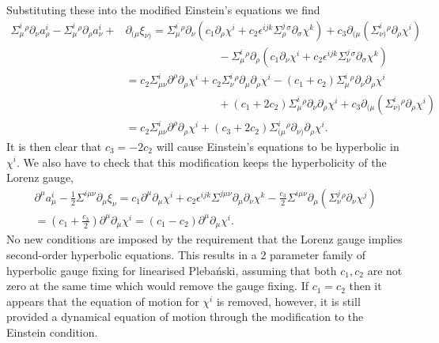 \documentclass[10pt]{report}
\newcommand{\pleb}[0]{Pleba\'nski}
\theoremstyle{definition}
\begin{document}
        Substituting these into the modified Einstein's equations we find 
        \begin{align}
            \Sigma^i_\mu{}^\rho \partial_\nu a^i_\rho - \Sigma^i_\mu{}^\rho \partial_\rho a^i_\nu +& \partial_{(\mu} \xi_{\nu)} = \Sigma^i_\mu{}^\rho \partial_\nu \left( c_1 \partial_\rho \chi^i + c_2 \epsilon^{ijk} \Sigma^j_\rho{}^\sigma \partial_\sigma \chi^k \right) + c_3 \partial_{(\mu} \left( \Sigma^i_{\nu)}{}^\rho \partial_\rho \chi^i \right) \nonumber \\ & \hspace{100pt} - \Sigma^i_\mu{}^\rho \partial_\rho \left( c_1 \partial_\nu \chi^i + c_2 \epsilon^{ijk} \Sigma^j_\nu{}^\sigma \partial_\sigma \chi^k \right)  \nonumber\\ & =  c_2 \Sigma^i_{\mu\nu} \partial^\rho \partial_\rho \chi^i + c_2 \Sigma^i_\nu{}^\rho \partial_\mu \partial_\rho \chi^i - (c_1 + c_2) \Sigma^i_\mu{}^\rho \partial_\nu \partial_\rho \chi^i \nonumber \\ & \hspace{100pt} + (c_1 + 2 c_2) \Sigma^i_\mu{}^\rho \partial_\nu \partial_\rho \chi^i + c_3 \partial_{(\mu} \left( \Sigma^i_{\nu)}{}^\rho \partial_\rho \chi^i \right) \nonumber\\ &= c_2 \Sigma^i_{\mu\nu} \partial^\rho \partial_\rho \chi^i + (c_3 + 2 c_2) \Sigma^i_{(\mu}{}^\rho \partial_{\nu)} \partial_\rho \chi^i.
        \end{align}
        It is then clear that $c_3 = -2 c_2$ will cause Einstein's equations to be hyperbolic in $\chi^i$.
        We also have to check that this modification keeps the hyperbolicity of the Lorenz gauge,
        \begin{align}
            \partial^\mu a^i_\mu - \frac{1}{2} \Sigma^{i\mu\nu} \partial_\mu \xi_\nu = c_1 \partial^\mu \partial_\mu \chi^i + c_2 \epsilon^{ijk} \Sigma^{j\mu\nu} \partial_\mu \partial_\nu \chi^k - \frac{c_3}{2} \Sigma^{i\mu\nu} \partial_\mu \left(\Sigma^j_\nu{}^\rho \partial_\nu \chi^j \right) \\ = \left(  c_1 + \frac{c_3}{2} \right) \partial^\mu \partial_\mu \chi^i = ( c_1 - c_2) \partial^\mu \partial_\mu \chi^i.
        \end{align}
        No new conditions are imposed by the requirement that the Lorenz gauge implies second-order hyperbolic equations. This results in a 2 parameter family of hyperbolic gauge fixing for linearised \pleb{}, assuming that both $c_1,c_2$ are not zero at the same time which would remove the gauge fixing. If $c_1 = c_2$ then it appears that the equation of motion for $\chi^i$ is removed, however, it is still provided a dynamical equation of motion through the modification to the Einstein condition.
\end{document}
